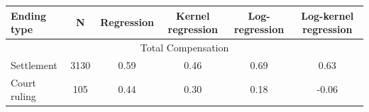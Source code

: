 \begin{tabular}{lccccc}
\toprule
  Ending type  & N & Regression & Kernel regression & Log-regression & Log-kernel regression \\
\midrule
\midrule
\multicolumn{6}{c}{Total Compensation} \\ 
\midrule
Settlement   & 3130 & 0.59    & 0.46     &  \cellcolor[rgb]{ .929,  .929,  .929} 0.69     & 0.63     \\
Court ruling & 105  & \cellcolor[rgb]{ .929,  .929,  .929} 0.44    & 0.30     & 0.18     & -0.06   \\
\bottomrule
\end{tabular}